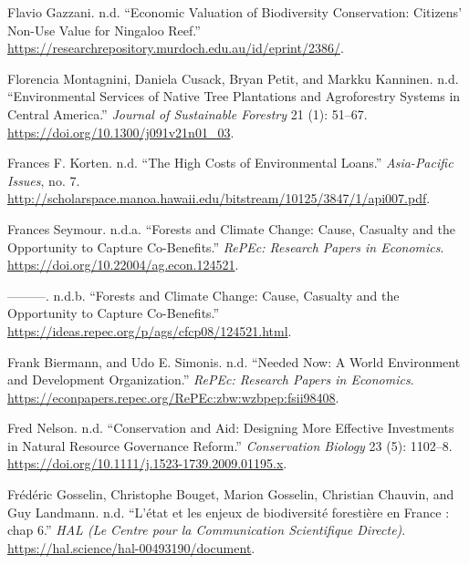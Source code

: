 \begin{CSLReferences}{1}{0}
Flavio Gazzani. n.d. {``Economic Valuation of Biodiversity Conservation:
Citizens' Non-Use Value for Ningaloo Reef.''}
\url{https://researchrepository.murdoch.edu.au/id/eprint/2386/}.

Florencia Montagnini, Daniela Cusack, Bryan Petit, and Markku Kanninen.
n.d. {``Environmental Services of Native Tree Plantations and
Agroforestry Systems in Central America.''} \emph{Journal of Sustainable
Forestry} 21 (1): 51--67. \url{https://doi.org/10.1300/j091v21n01_03}.

Frances F. Korten. n.d. {``The High Costs of Environmental Loans.''}
\emph{Asia-Pacific Issues}, no. 7.
\url{http://scholarspace.manoa.hawaii.edu/bitstream/10125/3847/1/api007.pdf}.

Frances Seymour. n.d.a. {``Forests and Climate Change: Cause, Casualty
and the Opportunity to Capture Co-Benefits.''} \emph{RePEc: Research
Papers in Economics}. \url{https://doi.org/10.22004/ag.econ.124521}.

---------. n.d.b. {``Forests and Climate Change: Cause, Casualty and the
Opportunity to Capture Co-Benefits.''}
\url{https://ideas.repec.org/p/ags/cfcp08/124521.html}.

Frank Biermann, and Udo E. Simonis. n.d. {``Needed Now: A World
Environment and Development Organization.''} \emph{RePEc: Research
Papers in Economics}.
\url{https://econpapers.repec.org/RePEc:zbw:wzbpep:fsii98408}.

Fred Nelson. n.d. {``Conservation and Aid: Designing More Effective
Investments in Natural Resource Governance Reform.''} \emph{Conservation
Biology} 23 (5): 1102--8.
\url{https://doi.org/10.1111/j.1523-1739.2009.01195.x}.

Frédéric Gosselin, Christophe Bouget, Marion Gosselin, Christian
Chauvin, and Guy Landmann. n.d. {``L'état et les enjeux de biodiversité
forestière en France : chap 6.''} \emph{HAL (Le Centre pour la
Communication Scientifique Directe)}.
\url{https://hal.science/hal-00493190/document}.


\end{CSLReferences}
